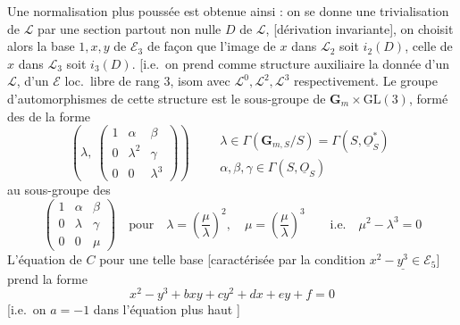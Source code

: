 \documentclass[11pt,a4paper]{article}
\begin{document}
Une normalisation  plus poussée est obtenue ainsi : on se
donne une trivialisation de $\mathcal{L}$ par une section partout non nulle %
$D$ de $\mathcal{L}$, [dérivation invariante], on choisit alors la base $1, x, y$
de $\mathcal{E}_3$ de façon que l'image de $x$ dans $\mathcal{L}_2$ soit
$i_2(D)$, celle de $x$ dans $\mathcal{L}_3$ soit $i_3(D)$.
\struck{\ill{}}
[i.e.\ on prend comme structure auxiliaire la donnée d'un  $\mathcal{L}$, d'un $\mathcal{E}$ loc.\ libre de rang $3$,  \ill{} \ill{} \ill{}  \ill{} \ill{} isom avec
$\mathcal{L}^0, \mathcal{L}^2, \mathcal{L}^3$ respectivement.
Le groupe d'automorphismes de cette structure est \struck{\ill{}}  le sous-groupe de $\mathbf{G}_m\times\mathrm{GL}(3)$, formé des 
\struck{\ill{}} de la forme
\[
\left(\lambda,\ \begin{pmatrix} 1 & \alpha & \beta \\ 0 & \lambda^2 & \gamma \\ 0 & 0 & \lambda^3 \end{pmatrix}\right)
\qquad
\begin{array}{l}
\lambda\in\Gamma(\mathbf{G}_{m,S}/S)=\Gamma(S,\underline{O}_S^*)\\
\alpha,\beta,\gamma\in\Gamma(S,\underline{O}_S)
\end{array}
\]
 \struck{\ill{}} au sous-groupe \struck{\ill{}} des
\[
\begin{pmatrix} 1 & \alpha & \beta \\ 0 & \lambda & \gamma \\ 0 & 0 & \mu \end{pmatrix}
\quad\text{pour}\quad
\lambda = \left(\frac{\mu}{\lambda}\right)^2, \quad
\mu = \left(\frac{\mu}{\lambda}\right)^3 \qquad\text{i.e.}\quad
\boxed{\mu^2 - \lambda^3 = 0}
\]
L'équation de $C$ pour une telle base 
[caractérisée par la condition $\underline{x^2-y^3\in\mathcal{E}_5}$] prend la
forme
\[
x^2 - y^3 + bxy + cy^2 + dx + ey + f = 0
\]
[i.e.\ on  $a=-1$ dans l'équation plus haut
]
\end{document}

